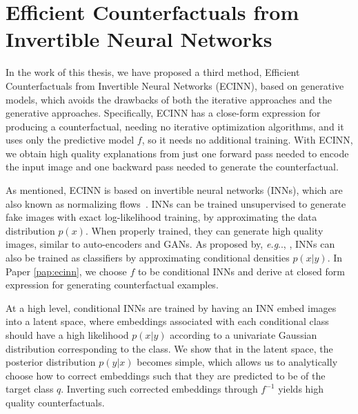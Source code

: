 \documentclass[11pt,a4paper,twoside,openright,final]{memoir}
\makeatletter
\DeclareRobustCommand\onedot{\futurelet\@let@token\@onedot}
\def\@onedot{\ifx\@let@token.\else.\null\fi\xspace}
\def\eg{\emph{e.g}\onedot} \def\Eg{\emph{E.g}\onedot}
\newcommand\contribution[1]{\hspace{0.5em}\hyperref[#1]{\ding{81}}}
\newcommand*{\paperref}[1]{Paper \hyperref[#1]{\ref{#1}}}
\makeatother
\begin{document}
\section{Efficient Counterfactuals from Invertible Neural Networks\contribution{pap:ecinn}}
In the work of this thesis, we have proposed a third method, Efficient Counterfactuals from Invertible Neural Networks (ECINN), based on generative models, which avoids the drawbacks of both the iterative approaches and the generative approaches.
Specifically, ECINN has a close-form expression for producing a counterfactual, needing no iterative optimization algorithms, and it uses only the predictive model $f$, so it needs no additional training. 
With ECINN, we obtain high quality explanations from just one forward pass needed to encode the input image and one backward pass needed to generate the counterfactual. 

As mentioned, ECINN is based on invertible neural networks (INNs), which are also known as normalizing flows~\cite{realnvp, nice, glow}.
INNs can be trained unsupervised to generate fake images with exact log-likelihood training, by approximating the data distribution $p(x)$.
When properly trained, they can generate high quality images, similar to auto-encoders and GANs.
As proposed by, \eg, \citet{ibinn}, INNs can also be trained as classifiers by approximating conditional densities $p(x | y)$.  
In \paperref{pap:ecinn}, we choose $f$ to be conditional INNs and derive at closed form expression for generating counterfactual examples. 

At a high level, conditional INNs are trained by having an INN embed images into a latent space, where embeddings associated with each conditional class should have a high likelihood $p(x|y)$ according to a univariate Gaussian distribution corresponding to the class.
We show that in the latent space, the posterior distribution $p(y|x)$ becomes simple, which allows us to analytically choose how to correct embeddings such that they are predicted to be of the target class $q$. 
Inverting such corrected embeddings through $f^{-1}$ yields high quality counterfactuals. 
\end{document}
